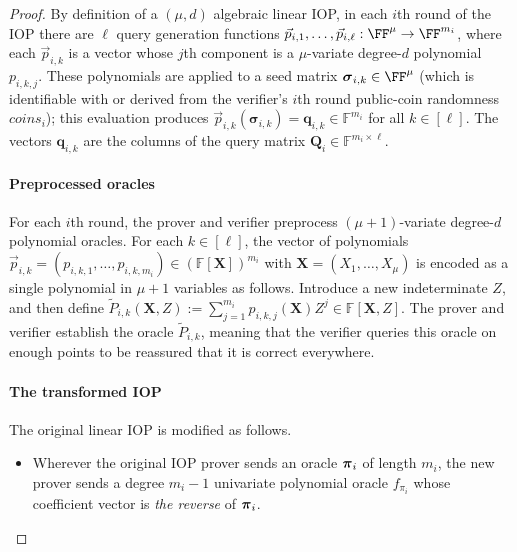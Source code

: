 \begin{proof}
By definition of a $(\mu, d)$ algebraic linear IOP, in each $i$th round of the IOP there are $\ell$ query generation functions $\vec{p}_{i,1},\ldots,\vec{p}_{i,\ell}: \FF^\mu \rightarrow \FF^{m_i}$, where each $\vec{p}_{i,k}$ is a vector whose $j$th component is a $\mu$-variate degree-$d$ polynomial $p_{i,k,j}$. These polynomials are applied to a seed matrix $\boldsymbol{\sigma}_{i,k} \in \FF^\mu$ (which is identifiable with or derived from the verifier's $i$th round public-coin randomness $\mathit{coins}_i$); this evaluation produces $\vec{p}_{i,k}(\boldsymbol{\sigma}_{i,k}) = \mathbf{q}_{i,k} \in \mathbb{F}^{m_i}$ for all $k \in [\ell]$. The vectors $\mathbf{q}_{i,k}$ are the columns of the query matrix $\mathbf{Q}_i \in \mathbb{F}^{m_i \times \ell}$.

\paragraph{Preprocessed oracles} 
For each $i$th round, the prover and verifier preprocess $(\mu+1)$-variate degree-$d$ polynomial oracles. %
For each $k \in [\ell]$, the vector of polynomials $\vec{p}_{i,k} = (p_{i,k,1},\ldots,p_{i,k, m_i}) \in (\mathbb{F}[\mathbf{X}])^{m_i}$ with $\mathbf{X} = (X_1,\ldots,X_\mu)$ is encoded as a single polynomial in $\mu + 1$ variables as follows. Introduce a new indeterminate $Z$, and then define $\tilde{P}_{i,k}(\mathbf{X}, Z) := \sum_{j=1}^{m_i} p_{i,k,j}(\mathbf{X}) Z^j \in \mathbb{F}[\mathbf{X},Z]$.
The prover and verifier establish the oracle $\tilde{P}_{i,k}$, meaning that the verifier queries this oracle on enough points to be reassured that it is correct everywhere.

\paragraph{The transformed IOP} 
The original linear IOP is modified as follows. 

\begin{itemize}

\item Wherever the original IOP prover sends an oracle $\boldsymbol{\pi}_i$ of length $m_i$, the new prover sends a degree $m_i - 1$ univariate polynomial oracle $f_{\pi_i}$ whose coefficient vector is \emph{the reverse} of $\boldsymbol{\pi}_i$. 


\end{itemize}
\end{proof}
